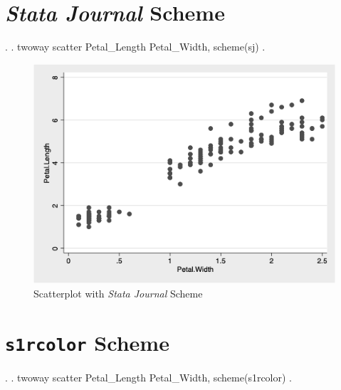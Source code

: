 \documentclass[]{article}
\begin{document}
\hypertarget{stata-journal-scheme}{%
\section{\texorpdfstring{\emph{Stata Journal}
Scheme}{Stata Journal Scheme}}\label{stata-journal-scheme}}

\begin{stlog}
. 
. twoway scatter Petal_Length Petal_Width, scheme(sj)
{\smallskip}
. 
\end{stlog}

\begin{stlog}


{\smallskip}

\end{stlog}

\begin{figure}
\centering
\includegraphics[width=0.75\linewidth]{sjscatter.png}
\caption{Scatterplot with \emph{Stata Journal} Scheme}
\end{figure}

\hypertarget{s1rcolor-scheme}{%
\section{\texorpdfstring{\texttt{s1rcolor}
Scheme}{s1rcolor Scheme}}\label{s1rcolor-scheme}}

\begin{stlog}
. 
. twoway scatter Petal_Length Petal_Width, scheme(s1rcolor)
{\smallskip}
. 
\end{stlog}

\begin{stlog}


{\smallskip}

\end{stlog}
\end{document}
